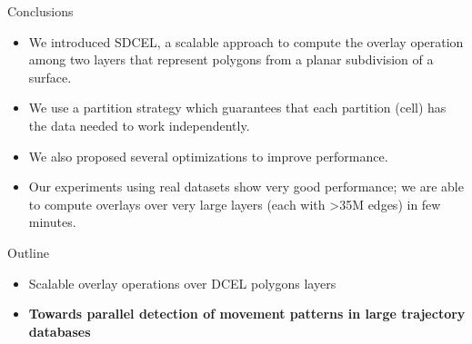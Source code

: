 \documentclass{beamer}
\begin{document}
    \begin{frame}{Conclusions}
        \begin{itemize}
            \item We introduced SDCEL, a scalable approach to compute the overlay operation among two layers that represent polygons from a planar subdivision of a surface.
            \item We use a partition strategy which guarantees that each partition (cell) has the data needed to work independently.
            \item We also proposed several optimizations to improve performance.
            \item Our experiments using real datasets show very good performance; we are able to compute overlays over very large layers (each with >35M edges) in few minutes.
        \end{itemize}
    \end{frame}    


    \begin{frame}{Outline}
        \begin{itemize}
                \item Scalable overlay operations over DCEL polygons layers
                \item \textbf{Towards parallel detection of movement patterns in large trajectory databases}
        \end{itemize}
    \end{frame}
\end{document}
